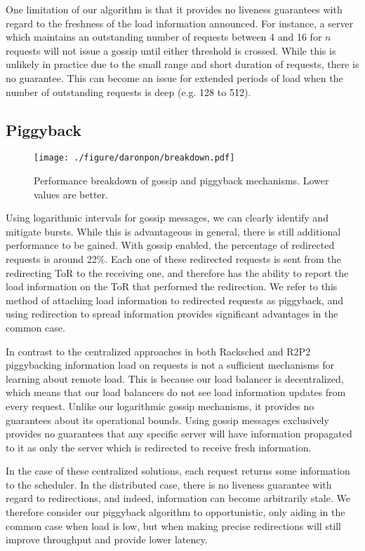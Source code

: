 One limitation of our algorithm is that it provides no liveness
guarantees with regard to the freshness of the load information
announced. For instance, a server which maintains an outstanding number
of requests between 4 and 16 for $n$ requests will not issue a gossip
until either threshold is crossed. While this is unlikely in practice
due to the small range and short duration of requests, there is no
guarantee. This can become an issue for extended periods of load when
the number of outstanding requests is deep (e.g. 128 to 512).

\subsection{Piggyback}

\label{subsec:piggyback}
\begin{figure}[t]
  \centering
    \texttt{[image: ./figure/daronpon/breakdown.pdf]}
    \centering
    \caption{Performance breakdown of gossip and piggyback mechanisms.
    Lower values are better.} 
  \label{fig:breakdown}
\end{figure}

Using logarithmic intervals for gossip messages, we can clearly identify and
mitigate bursts.  While this is advantageous in general, there is still
additional performance to be gained.  With gossip enabled, the percentage of
redirected requests is around 22\%. Each one of these redirected requests is
sent from the redirecting ToR to the receiving one, and therefore has the
ability to report the load information on the ToR that performed the
redirection.  We refer to this method of attaching load information to
redirected requests as piggyback, and using redirection to spread information
provides significant advantages in the common case.

In contrast to the centralized approaches in both Racksched and
R2P2~\cite{racksched, r2p2} piggybacking information load on requests
is not a sufficient mechanisms for learning about remote load. This is
because our load balancer is decentralized, which means that our load
balancers do not see load information updates from every request.
Unlike our logarithmic gossip mechanisms, it provides no guarantees
about its operational bounds. Using gossip messages exclusively
provides no guarantees that any specific server will have information
propagated to it as only the server which is redirected to receive
fresh information.

In the case of these centralized solutions, each request returns some
information to the scheduler. In the distributed case, there is no liveness
guarantee with regard to redirections, and indeed, information can become
arbitrarily stale. We therefore consider our piggyback algorithm to
opportunistic, only aiding in the common case when load is low, but when making
precise redirections will still improve throughput and provide
lower latency.

